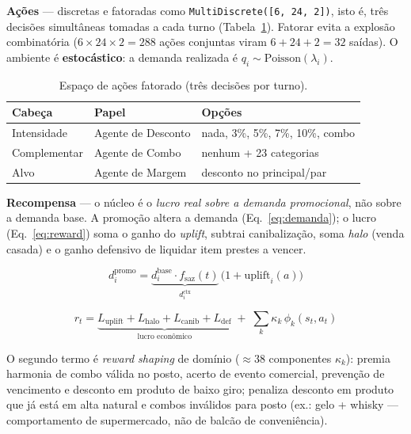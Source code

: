 \documentclass[9pt,a4paper,twoside]{tau}
\begin{document}
\textbf{Ações} --- discretas e fatoradas como
\texttt{MultiDiscrete([6, 24, 2])}, isto é, três decisões simultâneas
tomadas a cada turno (Tabela~\ref{tab:acoes}). Fatorar evita a explosão
combinatória (\(6\times24\times2=288\) ações conjuntas viram \(6+24+2=32\)
saídas). O ambiente é \textbf{estocástico}: a demanda realizada é
\(q_i \sim \text{Poisson}(\lambda_i)\).

\begin{table}[htbp]
    \caption{Espaço de ações fatorado (três decisões por turno).}
    \label{tab:acoes}
    \centering
    \small
    \begin{tabular}{lll}
        \toprule
        \textbf{Cabeça} & \textbf{Papel} & \textbf{Opções} \\
        \midrule
        Intensidade & Agente de Desconto & nada, 3\%, 5\%, 7\%, 10\%, combo \\
        Complementar & Agente de Combo & nenhum + 23 categorias \\
        Alvo & Agente de Margem & desconto no principal/par \\
        \bottomrule
    \end{tabular}
\end{table}

\textbf{Recompensa} --- o núcleo é o \textit{lucro real sobre a demanda
promocional}, não sobre a demanda base. A promoção altera a demanda
(Eq.~\ref{eq:demanda}); o lucro (Eq.~\ref{eq:reward}) soma o ganho do
\textit{uplift}, subtrai canibalização, soma \textit{halo} (venda casada)
e o ganho defensivo de liquidar item prestes a vencer.

\begin{equation} \label{eq:demanda}
d^{\text{promo}}_i = \underbrace{d^{\text{base}}_i \cdot f_{\text{saz}}(t)}_{d^{\text{ctx}}_i}\,\bigl(1 + \text{uplift}_i(a)\bigr)
\end{equation}

\begin{equation}\label{eq:reward}
r_t = \underbrace{L_{\text{uplift}} + L_{\text{halo}} + L_{\text{canib}} + L_{\text{def}}}_{\text{lucro econômico}} \;+\; \sum_{k} \kappa_k\,\phi_k(s_t,a_t)
\end{equation}

O segundo termo é \textit{reward shaping} de domínio (\(\approx 38\)
componentes \(\kappa_k\)): premia harmonia de combo válida no posto,
acerto de evento comercial, prevenção de vencimento e desconto em produto
de baixo giro; penaliza desconto em produto que já está em alta natural e
combos inválidos para posto (ex.: gelo + whisky --- comportamento de
supermercado, não de balcão de conveniência).
\end{document}
